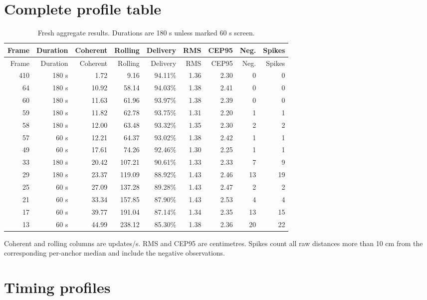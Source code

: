 \documentclass[11pt,a4paper]{article}
\begin{document}
\clearpage
\appendix

\section{Complete profile table}

\begin{longtable}{rrrrrrrrr}
  \caption{Fresh aggregate results. Durations are 180 s unless marked
  60 s screen.}\\
  \toprule
  Frame & Duration & Coherent & Rolling & Delivery & RMS & CEP95 & Neg. & Spikes\\
  \midrule
  \endfirsthead
  \toprule
  Frame & Duration & Coherent & Rolling & Delivery & RMS & CEP95 & Neg. & Spikes\\
  \midrule
  \endhead
  410 & 180 s & 1.72 & 9.16 & 94.11\% & 1.36 & 2.30 & 0 & 0\\
  64 & 180 s & 10.92 & 58.14 & 94.03\% & 1.38 & 2.41 & 0 & 0\\
  60 & 180 s & 11.63 & 61.96 & 93.97\% & 1.38 & 2.39 & 0 & 0\\
  59 & 180 s & 11.82 & 62.78 & 93.75\% & 1.31 & 2.20 & 1 & 1\\
  58 & 180 s & 12.00 & 63.48 & 93.32\% & 1.35 & 2.30 & 2 & 2\\
  57 & 60 s & 12.21 & 64.37 & 93.02\% & 1.38 & 2.42 & 1 & 1\\
  49 & 60 s & 17.61 & 74.26 & 92.46\% & 1.30 & 2.25 & 1 & 1\\
  33 & 180 s & 20.42 & 107.21 & 90.61\% & 1.33 & 2.33 & 7 & 9\\
  29 & 180 s & 23.37 & 119.09 & 88.92\% & 1.43 & 2.46 & 13 & 19\\
  25 & 60 s & 27.09 & 137.28 & 89.28\% & 1.43 & 2.47 & 2 & 2\\
  21 & 60 s & 33.34 & 157.85 & 87.90\% & 1.43 & 2.53 & 4 & 4\\
  17 & 60 s & 39.77 & 191.04 & 87.14\% & 1.34 & 2.35 & 13 & 15\\
  13 & 60 s & 44.99 & 238.12 & 85.30\% & 1.38 & 2.36 & 20 & 22\\
  \bottomrule
\end{longtable}

Coherent and rolling columns are updates/s. RMS and CEP95 are centimetres.
Spikes count all raw distances more than 10 cm from the corresponding
per-anchor median and include the negative observations.

\section{Timing profiles}
\end{document}
